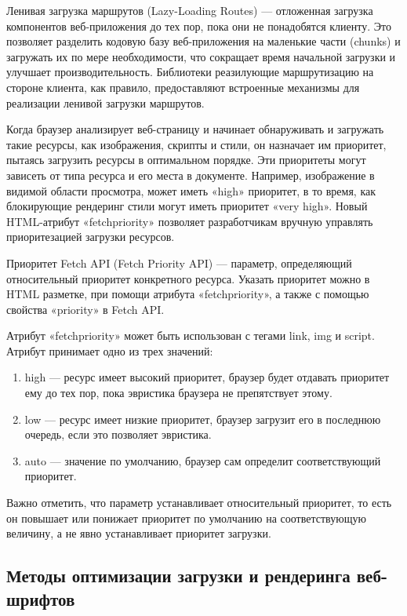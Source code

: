 Ленивая загрузка маршрутов (Lazy-Loading Routes) — отложенная загрузка компонентов веб-приложения до тех пор, пока они не понадобятся клиенту. Это позволяет разделить кодовую базу веб-приложения на маленькие части (chunks) и загружать их по мере необходимости, что сокращает время начальной загрузки и улучшает производительность. Библиотеки реазилующие маршрутизацию на стороне клиента, как правило, предоставляют встроенные механизмы для реализации ленивой загрузки маршрутов.

Когда браузер анализирует веб-страницу и начинает обнаруживать и загружать такие ресурсы, как изображения, скрипты и стили, он назначает им приоритет, пытаясь загрузить ресурсы в оптимальном порядке. Эти приоритеты могут зависеть от типа ресурса и его места в документе. Например, изображение в видимой области просмотра, может иметь «high» приоритет, в то время, как блокирующие рендеринг стили могут иметь приоритет «very high». Новый HTML-атрибут «fetchpriority» позволяет разработчикам вручную управлять приоритезацией загрузки ресурсов.

Приоритет Fetch API (Fetch Priority API) — параметр, определяющий относительный приоритет конкретного ресурса. Указать приоритет можно в HTML разметке, при помощи атрибута «fetchpriority», а также с помощью свойства «priority» в Fetch API.

Атрибут «fetchpriority» может быть использован с тегами link, img и script. Атрибут принимает одно из трех значений:

\begin{enumerate} 
  \item high — ресурс имеет высокий приоритет, браузер будет отдавать приоритет ему до тех пор, пока эвристика браузера не препятствует этому.
  
  \item low — ресурс имеет низкие приоритет, браузер загрузит его в последнюю очередь, если это позволяет эвристика.

  \item auto — значение по умолчанию, браузер сам определит соответствующий приоритет.
\end{enumerate}

Важно отметить, что параметр устанавливает относительный приоритет, то есть он повышает или понижает приоритет по умолчанию на соответствующую величину, а не явно устанавливает приоритет загрузки.

\subsection{Методы оптимизации загрузки и рендеринга веб-шрифтов}

